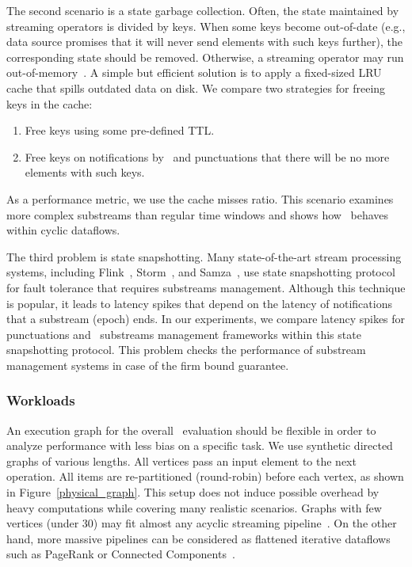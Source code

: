 The second scenario is a state garbage collection. Often, the state maintained by streaming operators is divided by keys. When some keys become out-of-date (e.g., data source promises that it will never send elements with such keys further), the corresponding state should be removed. Otherwise, a streaming operator may run out-of-memory~\cite{Tucker:2003:EPS:776752.776780}. A simple but efficient solution is to apply a fixed-sized LRU cache that spills outdated data on disk. We compare two strategies for freeing keys in the cache:
\begin{enumerate}
    \item Free keys using some pre-defined TTL.
    \item Free keys on notifications by \tracker\ and punctuations that there will be no more elements with such keys.
\end{enumerate}
As a performance metric, we use the cache misses ratio. This scenario examines more complex substreams than regular time windows and shows how \tracker\ behaves within cyclic dataflows.

The third problem is state snapshotting. Many state-of-the-art stream processing systems, including Flink~\cite{Carbone:2017:SMA:3137765.3137777}, Storm~\cite{Toshniwal:2014:STO:2588555.2595641}, and Samza~\cite{Noghabi:2017:SSS:3137765.3137770}, use state snapshotting protocol~\cite{2015arXiv150608603C} for fault tolerance that requires substreams management. Although this technique is popular, it leads to latency spikes that depend on the latency of notifications that a substream (epoch) ends. In our experiments, we compare latency spikes for punctuations and \tracker\ substreams management frameworks within this state snapshotting protocol. This problem checks the performance of substream management systems in case of the firm bound guarantee.

\subsubsection{Workloads}

An execution graph for the overall \tracker\ evaluation should be flexible in order to analyze performance with less bias on a specific task. We use synthetic directed graphs of various lengths. All vertices pass an input element to the next operation. All items are re-partitioned (round-robin) before each vertex, as shown in Figure~\ref{physical_graph}. This setup does not induce possible overhead by heavy computations while covering many realistic scenarios. Graphs with few vertices (under 30) may fit almost any acyclic streaming pipeline~\cite{akidau2018streaming}. On the other hand, more massive pipelines can be considered as flattened iterative dataflows such as PageRank or Connected Components~\cite{Murray:2013:NTD:2517349.2522738, xu2016efficient}.

